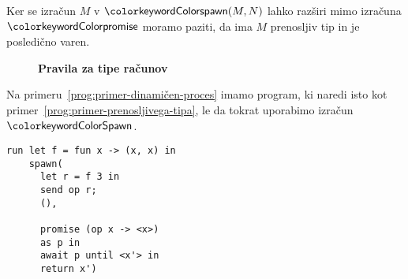Ker se izračun $M$ v $\tmspawn{M}{N}$ lahko razširi mimo izračuna $\tmkw{promise}$ moramo paziti, da ima $M$ prenosljiv tip in je posledično varen.   

\begin{figure}[h]
	\centering
	\small
	\textbf{Pravila za tipe računov}
	\begin{mathpar}
	\end{mathpar}
\end{figure}


Na primeru~\ref{prog:primer-dinamičen-proces} imamo program, ki naredi isto kot primer~\ref{prog:primer-prenosljivega-tipa}, le da tokrat uporabimo izračun $\tmkw{Spawn}$.

\begin{lstlisting}[caption={Primer uporabe dinamičnih procesov.},label={prog:primer-dinamičen-proces}]
run let f = fun x -> (x, x) in
    spawn(
      let r = f 3 in
      send op r;
      (),
      
      promise (op x -> <x>)
      as p in
      await p until <x'> in
      return x')
\end{lstlisting}



%
%
%
%	
%
%
%



